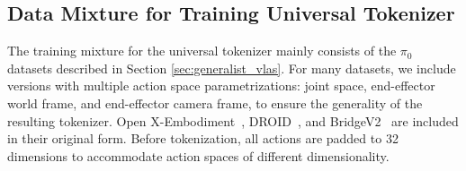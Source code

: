 
\subsection{Data Mixture for Training Universal Tokenizer}
\label{sec:app_universal_data_mix}

The training mixture for the universal tokenizer mainly consists of the $\pi_0$~\citep{black2024pi_0} datasets described in Section \ref{sec:generalist_vlas}.
For many datasets, we include versions with multiple action space parametrizations: joint space, end-effector world frame, and end-effector camera frame, to ensure the generality of the resulting tokenizer.
Open X-Embodiment~\citep{open_x_embodiment_rt_x_2023}, DROID~\citep{khazatsky2024droid}, and Bridge\;V2~\citep{walke2023bridgedata} are included in their original form. Before tokenization, all actions are padded to 32 dimensions to accommodate action spaces of different dimensionality.

